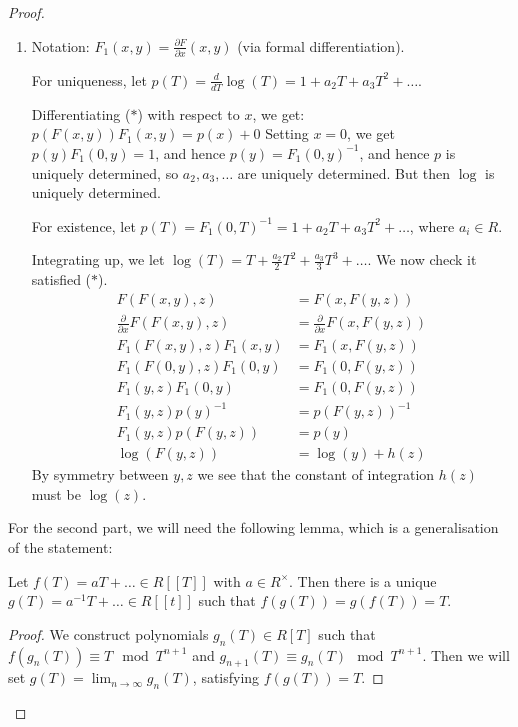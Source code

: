 \documentclass[10pt,a4paper]{article}
\begin{document}
\begin{proof}\hspace*{0cm}
  \begin{enumerate}
    \item Notation: $F_1(x, y) = \frac{\partial F}{\partial x}(x, y)$ (via formal differentiation).

    For uniqueness, let $p(T) = \frac{d}{dT} \log(T) = 1 + a_2T + a_3T^2 + \ldots$.

    Differentiating ($\ast$) with respect to $x$, we get: $p(F(x, y))F_1(x, y) = p(x)+0$
    Setting $x = 0$, we get $p(y)F_1(0, y) = 1$, and hence $p(y) = F_1(0, y)^{-1}$, and hence $p$ is uniquely determined, so $a_2, a_3, \ldots$ are uniquely determined. But then $\log$ is uniquely determined.

    For existence, let $p(T) = F_1(0, T)^{-1} = 1 + a_2T + a_3 T^2 + \ldots$, where $a_i \in R$.

    Integrating up, we let $\log(T) = T + \frac{a_2}{2}T^2+\frac{a_3}{3}T^3+\ldots$. We now check it satisfied ($\ast$).
    \begin{align*}
      F(F(x, y), z) &= F(x, F(y, z))\\
      \frac{\partial}{\partial x} F(F(x,y), z) &= \frac{\partial}{\partial x} F(x, F(y, z))\\
      F_1(F(x, y), z) F_1(x,y) &= F_1(x, F(y, z))\\
      F_1(F(0, y), z) F_1(0,y) &= F_1(0, F(y, z))\\
      F_1(y, z) F_1(0, y) &= F_1(0, F(y, z))\\
      F_1(y,z) p(y)^{-1} &= p(F(y, z))^{-1}\\
      F_1(y, z) p(F(y,z)) &= p(y)\\
      \log(F(y, z)) &= \log(y) + h(z)
    \end{align*}
    By symmetry between $y, z$ we see that the constant of integration $h(z)$ must be $\log (z)$.
  \end{enumerate}
  For the second part, we will need the following lemma, which is a generalisation of the statement:
  \begin{lemma}
    Let $f(T) = aT + \ldots \in R[[T]]$ with $a \in R^\times$. Then there is a unique $g(T) = a^{-1}T+  \ldots \in R[[t]]$ such that $f(g(T)) = g(f(T)) = T$.
  \end{lemma}
  \begin{proof}
    We construct polynomials $g_n(T) \in R[T]$ such that $f(g_n(T)) \equiv T \mod T^{n+1}$ and $g_{n+1}(T) \equiv g_n(T) \mod T^{n+1}$. Then we will set $g(T) = \lim_{n\to\infty} g_n(T)$, satisfying $f(g(T)) = T$.


\end{proof}
\end{proof}
\end{document}
